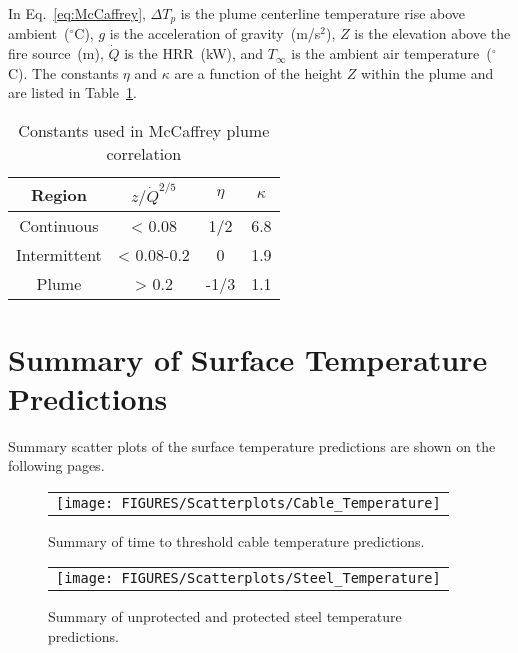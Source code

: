 In Eq.~\ref{eq:McCaffrey}, $\Delta T_p$ is the plume centerline temperature rise above ambient~($^\circ$C), $g$ is the acceleration of gravity~(m/s$^2$), $Z$ is the elevation above the fire source~(m), $\dot Q$ is the HRR~(kW), and $T_\infty$ is the ambient air temperature~($^\circ$C). The constants $\eta$ and $\kappa$ are a function of the height $Z$ within the plume and are listed in Table~\ref{tbl:McCaffrey_constants}.

\vspace{\baselineskip}
\begin{table}[ht]
\begin{center}
\caption{Constants used in McCaffrey plume correlation}
\label{tbl:McCaffrey_constants}
\begin{tabular}{|c|c|c|c|}
\hline
Region & $z/\dot Q^{2/5}$      & $\eta$ & $\kappa$ \\
\hline
Continuous & < 0.08       & 1/2  & 6.8 \\
Intermittent & < 0.08-0.2 & 0     & 1.9 \\
Plume         & > 0.2         & -1/3 & 1.1 \\
\hline
\end{tabular}
\end{center}
\end{table}

\clearpage

\section{Summary of Surface Temperature Predictions}

Summary scatter plots of the surface temperature predictions are shown on the following pages.

\begin{figure}[ht]
\begin{center}
\begin{tabular}{l}
\texttt{[image: FIGURES/Scatterplots/Cable\_Temperature]}
\end{tabular}
\end{center}
\caption[Summary of time to threshold cable temperature predictions.]
{Summary of time to threshold cable temperature predictions.}
\label{Surface_Temperature_THIEF_Summary}
\end{figure}

\begin{figure}[p]
\begin{center}
\begin{tabular}{l}
\texttt{[image: FIGURES/Scatterplots/Steel\_Temperature]}
\end{tabular}
\end{center}
\caption[Summary of steel temperature predictions.]
{Summary of unprotected and protected steel temperature predictions.}
\label{Surface_Temperature_Steel_Summary}
\end{figure}

